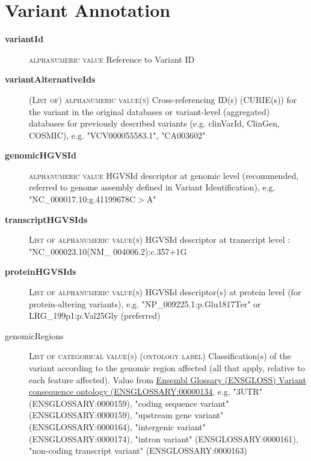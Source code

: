 \documentclass[a4paper, 10pt]{article}        %
\begin{document}
 
  \section*{ {\color{teal} Variant Annotation}}
  
  \begin{description}
	\item[\textbf{variantId}] {\textsc{alphanumeric value}} Reference to Variant ID 	\item[\textbf{variantAlternativeIds}] {\textsc{(List of) alphanumeric value(s)}} Cross-referencing ID(s) (CURIE(s)) for the variant in the original databases or variant-level (aggregated) databases for previously described variants (e.g. clinVarId, ClinGen, COSMIC), e.g. "VCV000055583.1", "CA003602"
	\item[\textbf{genomicHGVSId}]  {\textsc{alphanumeric value}} HGVSId descriptor at genomic level (recommended, referred to genome assembly defined in Variant Identification), e.g. "NC\_000017.10:g.41199678C$>$A"
	\item[\textbf{transcriptHGVSIds}] {\textsc{List of alphanumeric value(s)}} HGVSId descriptor at transcript level : "NC\_000023.10(NM\_ 004006.2):c.357+1G%
	\item[\textbf{proteinHGVSIds}] {\textsc{List of alphanumeric value(s)}} HGVSId descriptor(s) at protein level (for protein-altering variants), e.g. "NP\_009225.1:p.Glu1817Ter" or LRG\_199p1:p.Val25Gly (preferred)
	\item[genomicRegions] {\textsc{List of categorical value(s) (ontology label)}} Classification(s) of the variant according to the genomic region affected (all that apply, relative to each feature affected). Value from \href{http://ensembl.org/glossary/ENSGLOSSARY_0000134}{Ensembl Glossary (ENSGLOSS) Variant consequence ontology (ENSGLOSSARY:00000134}, e.g. "3UTR" (ENSGLOSSARY:0000159), "coding sequence variant" (ENSGLOSSARY:0000159), "upstream gene variant" (ENSGLOSSARY:0000164), "intergenic variant" (ENSGLOSSARY:0000174), "intron variant" (ENSGLOSSARY:0000161), "non-coding transcript variant" (ENSGLOSSARY:0000163)


\end{description}
\end{document}

